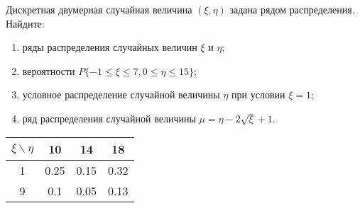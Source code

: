 \documentclass[12pt]{article}
\begin{document}
Дискретная двумерная случайная величина $(\xi, \eta)$ задана рядом распределения.
Найдите:

\begin{enumerate}
	\item ряды распределения случайных величин $\xi$ и $\eta$;
	\item вероятности $P\{-1 \leq \xi \leq 7, 0 \leq \eta \leq 15\}$;
	\item условное распределение случайной величины $\eta$ при условии $\xi = 1$;
	\item ряд распределения случайной величины $\mu = \eta - 2 \sqrt{\xi} + 1$.
\end{enumerate}

\begin{tabular}{|c|c|c|c|}
	\hline
	$\xi \backslash \eta$ & 10   & 14   & 18   \\
	\hline
	1                     & 0.25 & 0.15 & 0.32 \\
	\hline
	9                     & 0.1  & 0.05 & 0.13 \\
	\hline
\end{tabular}
\end{document}
